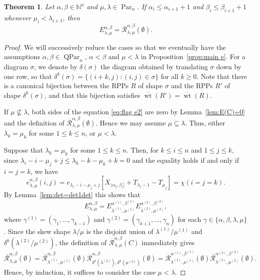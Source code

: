 \documentclass[12pt]{amsart}
\numberwithin{equation}{section}
\newtheorem{thm}{Theorem}[section]
\theoremstyle{definition}
\newcommand\NN{\mathbb{N}}
\newcommand\Par{\operatorname{Par}}
\newcommand\QPar{\operatorname{QPar}}
\newcommand\lm{{\lambda/\mu}}
\newcommand\wt{\operatorname{wt}}
\newcommand\R{\mathcal{R}}
\newcommand\oR{\overline{\R}}
\newcommand\owt{\overline{\wt}}
\begin{document}
\begin{thm}\label{thm:flag e2}
  Let $\alpha,\beta\in\NN^n$ and $\mu,\lambda\in\Par_n$.
If $\alpha_i\le \alpha_{i+1}+1$ and $\beta_i\le \beta_{i+1}+1$ whenever
$\mu_i<\lambda_{i+1}$, then
\begin{equation}
\label{eq:flag e2}
E_{\lambda,\mu}^{\alpha,\beta} = \oR_{\lambda,\mu}^{\alpha,\beta}(\emptyset).
\end{equation}
\end{thm}
\begin{proof}
  We will successively reduce the cases so that we eventually have the
  assumptions $\alpha,\beta\in\QPar_n$, $\alpha<\beta$ and $\mu<\lambda$ in
  Proposition~\ref{prop:main e}. For a diagram $\sigma$, we denote by
  $\delta(\sigma)$ the diagram obtained by translating $\sigma$ down by one row,
  so that $\delta^k(\sigma)=\{(i+k,j): (i,j)\in \sigma\}$ for all $k\ge0$. Note
  that there is a canonical bijection between the RPPs $R$ of shape $\sigma$ and
  the RPPs $R'$ of shape $\delta^k(\sigma)$, and that this bijection satisfies
  $\owt(R') = \owt(R)$.

  If $\mu\not\subseteq\lambda$, both sides of the equation
  \eqref{eq:flag e2} are zero by
  Lemma~\ref{lem:E(C)=0} and the definition of
  $\oR_{\lambda,\mu}^{\alpha,\beta}(\emptyset)$. Hence we may assume
  $\mu\subseteq\lambda$.
  Thus, either $\lambda_k = \mu_k$ for some $1 \le k \le n$, or $\mu < \lambda$.

  Suppose that $\lambda_k=\mu_k$ for some $1\le k\le n$. Then, for $k\le i\le n$
  and $1\le j\le k$, since $\lambda_i-i-\mu_j+j\le \lambda_k-k-\mu_k+k=0$ and
  the equality holds if and only if $i=j=k$, we have
  \[
    e^{\alpha,\beta}_{\lambda,\mu}(i,j) =
    e_{\lambda_i-i-\mu_j+j}[X_{(\alpha_j,\beta_i]}+T_{\lambda_i-1}-T_{\mu_j}] = \chi(i=j=k).
  \]
  By Lemma~\ref{lem:det=det1det} this shows that
  \[
    E_{\lambda,\mu}^{\alpha,\beta} = E_{\lambda^{(1)},\mu^{(1)}}^{\alpha^{(1)},\beta^{(1)}}
    E_{\lambda^{(2)},\mu^{(2)}}^{\alpha^{(2)},\beta^{(2)}},
  \]
  where $\gamma^{(1)}=(\gamma_1,\dots,\gamma_{k-1})$ and
  $\gamma^{(2)}=(\gamma_{k+1},\dots,\gamma_{n})$ for each
  $\gamma\in\{\alpha,\beta,\lambda,\mu\}$. Since the skew shape $\lm$ is the
  disjoint union of $\lambda^{(1)}/\mu^{(1)}$ and $\delta^k(\lambda^{(2)}/\mu^{(2)})$, the
  definition of $\oR_{\lambda,\mu}^{\alpha,\beta}(C)$ immediately gives
  \[
    \oR_{\lambda,\mu}^{\alpha,\beta}(\emptyset) =
    \oR_{\lambda^{(1)},\mu^{(1)}}^{\alpha,\beta}(\emptyset)
    \oR_{\delta^k(\lambda^{(2)}),\delta^k(\mu^{(2)})}^{\alpha,\beta}(\emptyset)=
    \oR_{\lambda^{(1)},\mu^{(1)}}^{\alpha^{(1)},\beta^{(1)}}(\emptyset)
    \oR_{\lambda^{(2)},\mu^{(2)}}^{\alpha^{(2)},\beta^{(2)}}(\emptyset).
  \]
  Hence, by induction, it suffices to consider the case $\mu<\lambda$.


\end{proof}
\end{document}
